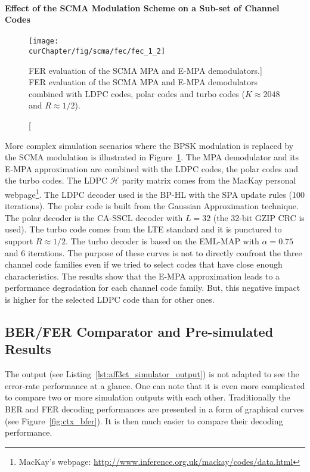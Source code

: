 \paragraph{Effect of the SCMA Modulation Scheme on a Sub-set of Channel Codes}

\begin{figure}[htp]
  \centering
  \texttt{[image: \\curChapter/fig/scma/fec/fec\_1\_2]}
  \caption
    [FER evaluation of the SCMA MPA and E-MPA demodulators.]
    {FER evaluation of the SCMA MPA and E-MPA demodulators combined with LDPC
     codes, polar codes and turbo codes ($K \approx 2048$ and $R \approx 1/2$).}
  \label{plot:aff3ct_scma_fec}
\end{figure}

More complex simulation scenarios where the BPSK modulation is replaced by the
SCMA modulation is illustrated in Figure~\ref{plot:aff3ct_scma_fec}. The MPA
demodulator and its E-MPA approximation are combined with the LDPC codes, the
polar codes and the turbo codes. The LDPC $\mathcal{H}$ parity matrix comes from
the MacKay personal webpage\footnote{MacKay's webpage:
\url{http://www.inference.org.uk/mackay/codes/data.html}}. The LDPC decoder used
is the BP-HL with the SPA update rules (100 iterations). The polar code is built
from the Gaussian Approximation technique. The polar decoder is the CA-SSCL
decoder with $L=32$ (the 32-bit GZIP CRC is used). The turbo code comes from the
LTE standard and it is punctured to support $R \approx 1/2$. The turbo decoder
is based on the EML-MAP with $\alpha = 0.75$ and 6 iterations. The purpose of
these curves is not to directly confront the three channel code families even if
we tried to select codes that have close enough characteristics. The results
show that the E-MPA approximation leads to a performance degradation for each
channel code family. But, this negative impact is higher for the selected LDPC
code than for other ones.

\subsection{BER/FER Comparator and Pre-simulated Results}

The \AFFECT output (see Listing~\ref{lst:aff3ct_simulator_output}) is not
adapted to see the error-rate performance at a glance. One can note that it is
even more complicated to compare two or more simulation outputs with each other.
Traditionally the BER and FER decoding performances are presented in a form of
graphical curves (see Figure~\ref{fig:ctx_bfer}). It is then much easier to
compare their decoding performance.

